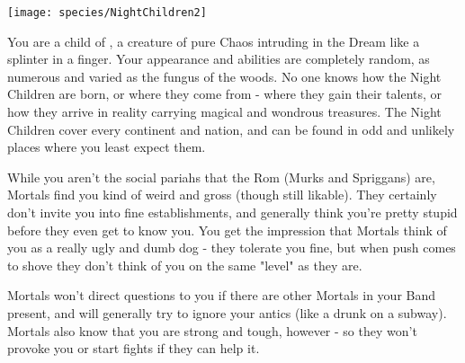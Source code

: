

\begin{center}
\texttt{[image: species/NightChildren2]}
\end{center}




You are a child of , a creature of pure Chaos intruding in the Dream like a splinter in a finger. Your appearance and abilities are completely random, as numerous and varied as the fungus of the woods. No one knows how the Night Children are born, or where they come from - where they gain their talents, or how they arrive in reality carrying magical and wondrous treasures. The Night Children cover every continent and nation, and can be found in odd and unlikely places where you least expect them. 

While you aren't the social pariahs that the Rom (Murks and Spriggans) are, Mortals find you kind of weird and gross (though still likable). They certainly don't invite you into fine establishments, and generally think you're pretty stupid before they even get to know you.  You get the impression that Mortals think of you as a really ugly and dumb dog - they tolerate you fine, but when push comes to shove they don't think of you on the same "level" as they are.

Mortals won't direct questions to you if there are other Mortals in your Band present, and will generally try to ignore your antics (like a drunk on a subway). Mortals also know that you are  strong and tough, however - so they won't provoke you or start fights if they can help it.




